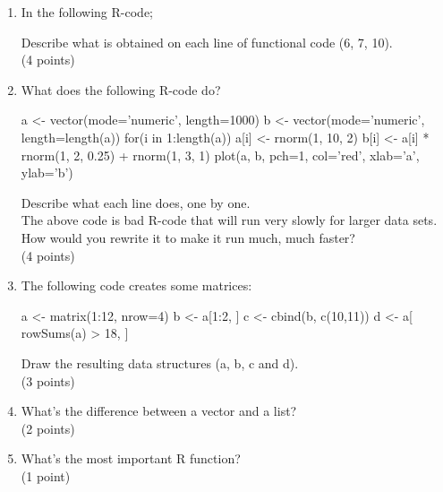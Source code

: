 \documentclass[11pt]{article}
\begin{document}
\begin{enumerate}
\item In the following R-code;

  Describe what is obtained on each line of functional code (6, 7, 10).\\
  (4 points)
\item What does the following R-code do?

  \begin{rcode}
    a <- vector(mode='numeric', length=1000)
    b <- vector(mode='numeric', length=length(a))
    for(i in 1:length(a)){
      a[i] <- rnorm(1, 10, 2)
      b[i] <- a[i] * rnorm(1, 2, 0.25) + rnorm(1, 3, 1)
    }
    plot(a, b, pch=1, col='red', xlab='a', ylab='b')    
  \end{rcode}
  Describe what each line does, one by one.\\
  The above code is bad R-code that will run very slowly for larger data
  sets. How would you rewrite it to make it run much, much faster?\\
  (4 points)
\item The following code creates some matrices:
 
  \begin{rcode}
    a <- matrix(1:12, nrow=4)
    b <- a[1:2, ]
    c <- cbind(b, c(10,11))
    d <- a[ rowSums(a) > 18, ]
  \end{rcode}
  Draw the resulting data structures (a, b, c and d).\\
  (3 points)
\item What's the difference between a vector and a list?\\
  (2 points)
\item What's the most important R function?\\
  (1 point)
\end{enumerate}
\end{document}
